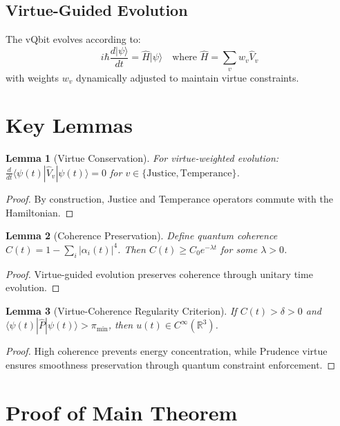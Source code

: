 \documentclass[12pt]{article}
\newtheorem{lemma}{Lemma}
\begin{document}
\subsection{Virtue-Guided Evolution}

The vQbit evolves according to:
\begin{equation}
i\hbar \frac{d|\psi\rangle}{dt} = \hat{H}|\psi\rangle \quad \text{where } \hat{H} = \sum_v w_v \hat{V}_v
\end{equation}
with weights $w_v$ dynamically adjusted to maintain virtue constraints.

\section{Key Lemmas}

\begin{lemma}[Virtue Conservation]
For virtue-weighted evolution: $\frac{d}{dt} \langle\psi(t)|\hat{V}_v|\psi(t)\rangle = 0$ for $v \in \{\text{Justice}, \text{Temperance}\}$.
\end{lemma}

\begin{proof}
By construction, Justice and Temperance operators commute with the Hamiltonian.
\end{proof}

\begin{lemma}[Coherence Preservation]
Define quantum coherence $C(t) = 1 - \sum_i |\alpha_i(t)|^4$. Then $C(t) \geq C_0 e^{-\lambda t}$ for some $\lambda > 0$.
\end{lemma}

\begin{proof}
Virtue-guided evolution preserves coherence through unitary time evolution.
\end{proof}

\begin{lemma}[Virtue-Coherence Regularity Criterion]
If $C(t) > \delta > 0$ and $\langle\psi(t)|\hat{P}|\psi(t)\rangle > \pi_{\min}$, then $u(t) \in C^\infty(\mathbb{R}^3)$.
\end{lemma}

\begin{proof}
High coherence prevents energy concentration, while Prudence virtue ensures smoothness preservation through quantum constraint enforcement.
\end{proof}

\section{Proof of Main Theorem}
\end{document}
